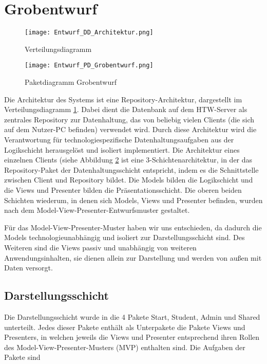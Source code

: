 \graphicspath{ {Entwurf/exports/png/} }


\section{Grobentwurf}
\begin{figure}
 \texttt{[image: Entwurf\_DD\_Architektur.png]}
 \label{fig:Deployment}
 \caption{Verteilungsdiagramm}
\end{figure}
\begin{figure}
 \texttt{[image: Entwurf\_PD\_Grobentwurf.png]}
 \label{fig:Paketdiagramm_Grobentwurf}
 \caption{Paketdiagramm Grobentwurf}
\end{figure}

Die Architektur des Systems ist eine Repository-Architektur, dargestellt im Verteilungsdiagramm \ref{fig:Deployment}. Dabei dient die Datenbank auf dem HTW-Server als zentrales Repository zur Datenhaltung, das von beliebig vielen Clients (die sich auf dem Nutzer-PC befinden) verwendet wird. Durch diese Architektur wird die Verantwortung für technologiespezifische Datenhaltungsaufgaben aus der Logikschicht herausgelöst und isoliert implementiert.
Die Architektur eines einzelnen Clients (siehe Abbildung \ref{fig:Paketdiagramm_Grobentwurf} ist eine 3-Schichtenarchitektur, in der das Repository-Paket der Datenhaltungsschicht entspricht, indem es die Schnittstelle zwischen Client und Repository bildet. Die Models bilden die Logikschicht und die Views und Presenter bilden die Präsentationsschicht. Die oberen beiden Schichten wiederum, in denen sich Models, Views und Presenter befinden, wurden nach dem Model-View-Presenter-Entwurfsmuster gestaltet.

Für das Model-View-Presenter-Muster haben wir uns entschieden, da dadurch die Models technologieunabhängig und isoliert zur Darstellungsschicht sind. Des Weiteren sind die Views passiv und unabhängig von weiteren Anwendungsinhalten, sie dienen allein zur Darstellung und werden von außen mit Daten versorgt.

\subsection{Darstellungsschicht}
Die Darstellungsschicht wurde in die 4 Pakete Start, Student, Admin und Shared unterteilt. Jedes dieser Pakete enthält als Unterpakete die Pakete Views und Presenters, in welchen jeweils die Views und Presenter entsprechend ihren Rollen des Model-View-Presenter-Musters (MVP) enthalten sind. Die Aufgaben der Pakete sind

